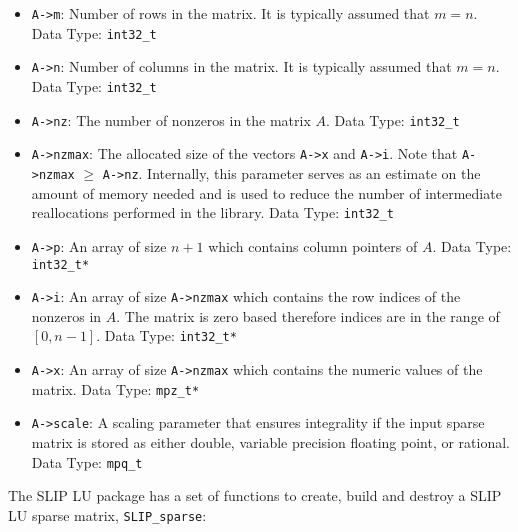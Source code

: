 \documentclass[11pt]{article}
\theoremstyle{definition}
\begin{document}
\begin{itemize}
\item \verb|A->m|: Number of rows in the matrix. It is typically assumed that
$m=n$.  Data Type: \verb|int32_t|

\item \verb|A->n|: Number of columns in the matrix. It is typically assumed
that $m=n$. Data Type: \verb|int32_t|

\item \verb|A->nz|: The number of nonzeros in the matrix $A$. Data Type:
\verb|int32_t|

\item \verb|A->nzmax|: The allocated size of the vectors \verb|A->x| and
\verb|A->i|. Note that \verb|A->nzmax| $\geq$ \verb|A->nz|. Internally, this
parameter serves as an estimate on the amount of memory needed and is used to
reduce the number of intermediate reallocations performed in the library. Data
Type: \verb|int32_t|

\item \verb|A->p|: An array of size $n+1$ which contains column pointers of
$A$. Data Type: \verb|int32_t*|

\item \verb|A->i|: An array of size \verb|A->nzmax| which contains the row
indices of the nonzeros in $A$. The matrix is zero based therefore indices are
in the range of $[0, n-1]$. Data Type: \verb|int32_t*|

\item \verb|A->x|: An array of size \verb|A->nzmax| which contains the numeric
values of the matrix. Data Type: \verb|mpz_t*|

\item \verb|A->scale|: A scaling parameter that ensures integrality if the
input sparse matrix is stored as either double, variable precision floating
point, or rational. Data Type: \verb|mpq_t|

\end{itemize}

The SLIP LU package has a set of functions to create, build and destroy a SLIP
LU sparse matrix, \verb|SLIP_sparse|:
\end{document}
